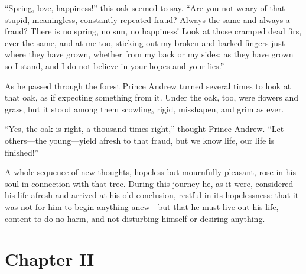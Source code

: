 ``Spring, love, happiness!'' this oak seemed to say. ``Are you
not weary of that stupid, meaningless, constantly repeated fraud?
Always the same and always a fraud? There is no spring, no sun,
no happiness! Look at those cramped dead firs, ever the same, and
at me too, sticking out my broken and barked fingers just where
they have grown, whether from my back or my sides: as they have
grown so I stand, and I do not believe in your hopes and your
lies.''

As he passed through the forest Prince Andrew turned several
times to look at that oak, as if expecting something from
it. Under the oak, too, were flowers and grass, but it stood
among them scowling, rigid, misshapen, and grim as ever.

``Yes, the oak is right, a thousand times right,'' thought Prince
Andrew.  ``Let others---the young---yield afresh to that fraud,
but we know life, our life is finished!''

A whole sequence of new thoughts, hopeless but mournfully
pleasant, rose in his soul in connection with that tree. During
this journey he, as it were, considered his life afresh and
arrived at his old conclusion, restful in its hopelessness: that
it was not for him to begin anything anew---but that he must live
out his life, content to do no harm, and not disturbing himself
or desiring anything.


\chapter*{Chapter II}
\ifaudio     
{} 
\fi

